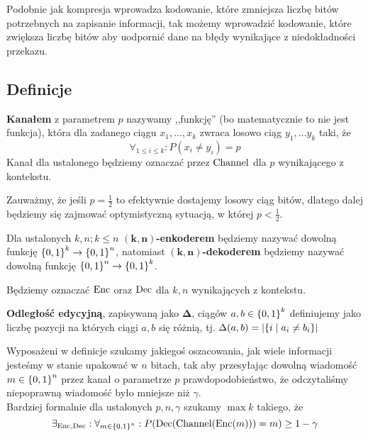 Podobnie jak kompresja wprowadza kodowanie, które zmniejsza liczbę bitów potrzebnych na zapisanie informacji, tak możemy wprowadzić kodowanie, które zwiększa liczbę bitów aby uodpornić dane na błędy wynikające z niedokładności przekazu.

\subsection{Definicje}

\begin{definition}
    \textbf{Kanałem} z parametrem \( p \) nazywamy ,,funkcję'' (bo matematycznie to nie jest funkcja), która dla zadanego ciągu \( x_1, \dots, x_k \) zwraca losowo ciąg \( y_1, \dots y_k \) taki, że 
    \[
        \forall_{1 \leq i \leq k} : P(x_i \neq y_i) = p
    \]
    Kanał dla ustalonego będziemy oznaczać przez \( \operatorname{Channel} \) dla \( p \) wynikającego z kontekstu.
\end{definition}

Zauważmy, że jeśli \( p = \frac{1}{2} \) to efektywnie dostajemy losowy ciąg bitów,
dlatego dalej będziemy się zajmować optymistyczną sytuacją, w której \( p < \frac{1}{2} \).

\begin{definition}
    Dla ustalonych \( k, n ; k \leq n \) \(\mathbf{(k, n)}\)\textbf{-enkoderem} będziemy nazywać dowolną funkcję \( \set{0, 1}^k \rightarrow \set{0, 1}^n \), natomiast
    \(\mathbf{(k, n)}\)\textbf{-dekoderem} będziemy nazywać dowolną funkcję \( \set{0, 1}^n \rightarrow \set{0, 1}^k \).
    
    Będziemy oznaczać \( \operatorname{Enc} \) oraz \( \operatorname{Dec} \) dla \( k, n \) wynikających z kontekstu.
\end{definition}

\begin{definition}
    \textbf{Odległość edycyjną}, zapisywaną jako \( \mathbf{\Delta} \), ciągów \(a, b \in \set{0, 1}^k\) definiujemy jako liczbę pozycji na których ciągi \( a, b \) się różnią, tj. \( \Delta(a, b) = \card{\set{i \mid a_i \neq b_i}} \)
\end{definition}

Wyposażeni w definicje szukamy jakiegoś oszacowania, jak wiele informacji jesteśmy w stanie upakować w \( n \) bitach, tak aby przesyłając dowolną wiadomość \( m \in \set{0, 1}^n \) przez kanał o parametrze \( p \) prawdopodobieństwo, że odczytaliśmy niepoprawną wiadomość było mniejsze niż \( \gamma \). \\
Bardziej formalnie dla ustalonych \( p, n, \gamma \) szukamy \( \max k \) takiego, że
\[
    \exists_{\Enc, \Dec} : \forall_{m \in \set{0, 1}^n}: P\pars{\Dec(\Channel(\Enc(m))) = m} \geq 1 - \gamma
\]

